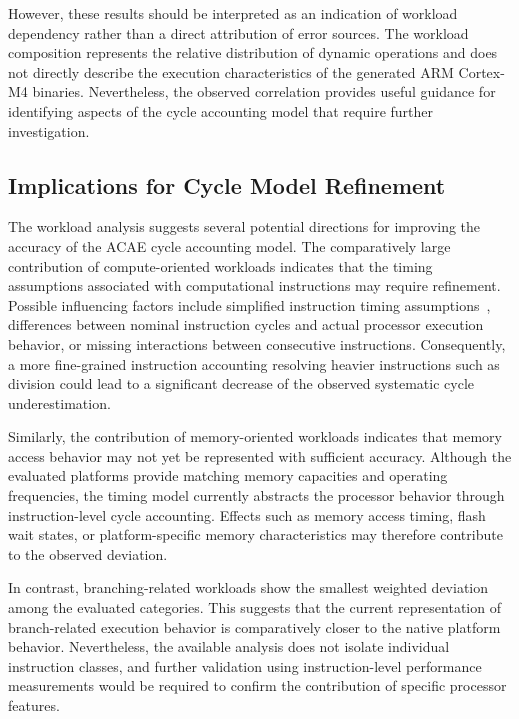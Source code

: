 \documentclass[conference]{IEEEtran}
\begin{document}
			However, these results should be interpreted as an indication of workload dependency rather than a direct attribution of error sources.
			The workload composition represents the relative distribution of dynamic operations and does not directly describe the execution characteristics of the generated ARM Cortex-M4 binaries.
			Nevertheless, the observed correlation provides useful guidance for identifying aspects of the cycle accounting model that require further investigation.

		\subsection{Implications for Cycle Model Refinement}

			The workload analysis suggests several potential directions for improving the accuracy of the \ac{ACAE} cycle accounting model.
			The comparatively large contribution of compute-oriented workloads indicates that the timing assumptions associated with computational instructions may require refinement.
			Possible influencing factors include simplified instruction timing assumptions~\cite{ACAE-REPO, ARMCM4DOC}, differences between nominal instruction cycles and actual processor execution behavior, or missing interactions between consecutive instructions.
			Consequently, a more fine-grained instruction accounting resolving heavier instructions such as division could lead to a significant decrease of the observed systematic cycle underestimation.

			Similarly, the contribution of memory-oriented workloads indicates that memory access behavior may not yet be represented with sufficient accuracy.
			Although the evaluated platforms provide matching memory capacities and operating frequencies, the timing model currently abstracts the processor behavior through instruction-level cycle accounting.
			Effects such as memory access timing, flash wait states, or platform-specific memory characteristics may therefore contribute to the observed deviation.

			In contrast, branching-related workloads show the smallest weighted deviation among the evaluated categories.
			This suggests that the current representation of branch-related execution behavior is comparatively closer to the native platform behavior.
			Nevertheless, the available analysis does not isolate individual instruction classes, and further validation using instruction-level performance measurements would be required to confirm the contribution of specific processor features.
\end{document}
